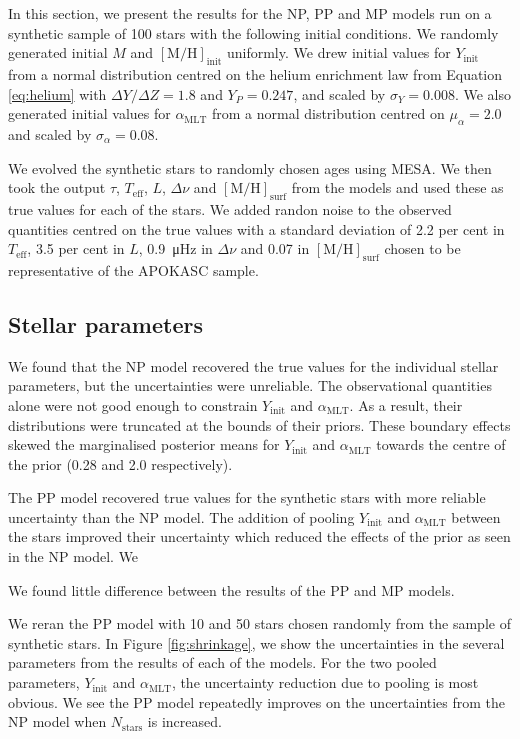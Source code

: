 \documentclass[a4paper,fleqn,usenatbib]{mnras}
\newcommand{\dnu}{\ensuremath{\Delta\nu}}
\newcommand{\metallicity}{\ensuremath{[\mathrm{M}/\mathrm{H}]}}
\newcommand{\teff}{\ensuremath{T_\mathrm{eff}}}
\newcommand{\mlt}{\ensuremath{{\alpha_\mathrm{MLT}}}}
\begin{document}
In this section, we present the results for the NP, PP and MP models run on a synthetic sample of 100 stars with the following initial conditions. We randomly generated initial $M$ and $\metallicity_\mathrm{init}$ uniformly. We drew initial values for $Y_\mathrm{init}$ from a normal distribution centred on the helium enrichment law from Equation \ref{eq:helium} with $\Delta Y / \Delta Z = 1.8$ and $Y_P = 0.247$, and scaled by $\sigma_Y = 0.008$. We also generated initial values for $\mlt$ from a normal distribution centred on $\mu_\alpha = 2.0$ and scaled by $\sigma_\alpha = 0.08$.

We evolved the synthetic stars to randomly chosen ages using \textsc{MESA}. We then took the output $\tau$, $\teff$, $L$, $\dnu$ and $\metallicity_\mathrm{surf}$ from the models and used these as true values for each of the stars. We added randon noise to the observed quantities centred on the true values with a standard deviation of 2.2 per cent in $\teff$, 3.5 per cent in $L$, \SI{0.9}{\micro\hertz} in $\dnu$ and \SI{0.07}{\dex} in $\metallicity_\mathrm{surf}$ chosen to be representative of the APOKASC sample.

\subsection{Stellar parameters}

We found that the NP model recovered the true values for the individual stellar parameters, but the uncertainties were unreliable. The observational quantities alone were not good enough to constrain $Y_\mathrm{init}$ and $\mlt$. As a result, their distributions were truncated at the bounds of their priors. These boundary effects skewed the marginalised posterior means for $Y_\mathrm{init}$ and $\mlt$ towards the centre of the prior (0.28 and 2.0 respectively).

The PP model recovered true values for the synthetic stars with more reliable uncertainty than the NP model. The addition of pooling $Y_\mathrm{init}$ and $\mlt$ between the stars improved their uncertainty which reduced the effects of the prior as seen in the NP model. We

We found little difference between the results of the PP and MP models.

We reran the PP model with 10 and 50 stars chosen randomly from the sample of synthetic stars. In Figure \ref{fig:shrinkage}, we show the uncertainties in the several parameters from the results of each of the models. For the two pooled parameters, $Y_\mathrm{init}$ and $\mlt$, the uncertainty reduction due to pooling is most obvious. We see the PP model repeatedly improves on the uncertainties from the NP model when $N_\mathrm{stars}$ is increased. 
\end{document}

